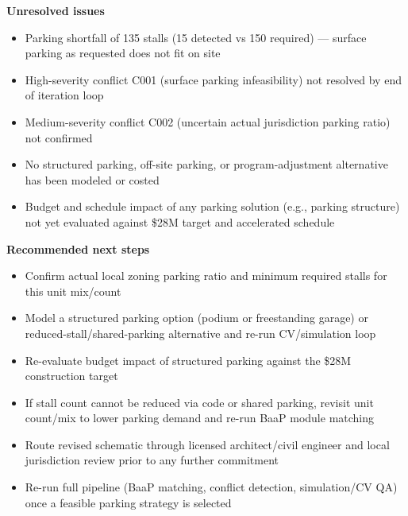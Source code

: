 \documentclass[10pt]{article}
\begin{document}
\textbf{Unresolved issues}
\begin{itemize}\item Parking shortfall of 135 stalls (15 detected vs 150 required) — surface parking as requested does not fit on site\item High-severity conflict C001 (surface parking infeasibility) not resolved by end of iteration loop\item Medium-severity conflict C002 (uncertain actual jurisdiction parking ratio) not confirmed\item No structured parking, off-site parking, or program-adjustment alternative has been modeled or costed\item Budget and schedule impact of any parking solution (e.g., parking structure) not yet evaluated against \$28M target and accelerated schedule\end{itemize}
\textbf{Recommended next steps}
\begin{itemize}\item Confirm actual local zoning parking ratio and minimum required stalls for this unit mix/count\item Model a structured parking option (podium or freestanding garage) or reduced-stall/shared-parking alternative and re-run CV/simulation loop\item Re-evaluate budget impact of structured parking against the \$28M construction target\item If stall count cannot be reduced via code or shared parking, revisit unit count/mix to lower parking demand and re-run BaaP module matching\item Route revised schematic through licensed architect/civil engineer and local jurisdiction review prior to any further commitment\item Re-run full pipeline (BaaP matching, conflict detection, simulation/CV QA) once a feasible parking strategy is selected\end{itemize}
\end{document}
